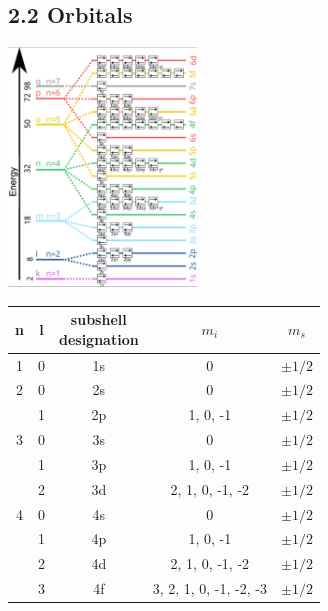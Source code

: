 

\subsection{2.2 Orbitals}
    \includegraphics[width = 5cm, angle=-90]{src/2_Atoms/images/Energieniveau.png}
    \begin{center}
        \begin{tabular}{||c | c | c | c | c||} 
         \hline
         n & l & \pbox{20cm}{subshell\\ designation} & $m_i$                  & $m_s$ \\ [0.5ex] 
         \hline\hline
         1 & 0 & 1s                   & 0                      & $\pm 1/2$ \\ 
         \hline
         2 & 0 & 2s                   & 0                      & $\pm 1/2$ \\
           & 1 & 2p                   & 1, 0, -1               & $\pm 1/2$ \\
         \hline
         3 & 0 & 3s                   & 0                      & $\pm 1/2$ \\
           & 1 & 3p                   & 1, 0, -1               & $\pm 1/2$ \\
           & 2 & 3d                   & 2, 1, 0, -1, -2        & $\pm 1/2$ \\
         \hline
         4 & 0 & 4s                   & 0                      & $\pm 1/2$ \\
           & 1 & 4p                   & 1, 0, -1               & $\pm 1/2$ \\
           & 2 & 4d                   & 2, 1, 0, -1, -2        & $\pm 1/2$ \\
           & 3 & 4f                   & 3, 2, 1, 0, -1, -2, -3 & $\pm 1/2$ \\
         \hline
        \end{tabular}
        \end{center}